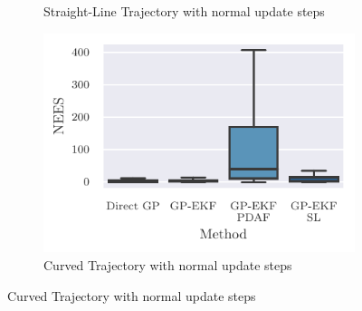 \begin{figure}
{\begin{subfigure}{0.6\textwidth}
            \caption{Straight-Line Trajectory with normal update steps}
            \label{fig:stats_straight_nees_update}
        \end{subfigure}
        \begin{subfigure}{0.6\textwidth}
            \includegraphics{figures/curved_line_stats/nees.pdf}
            \caption{Curved Trajectory with normal update steps}
            \label{fig:stats_curved_nees_update}
        \end{subfigure}
    }


\end{figure}
